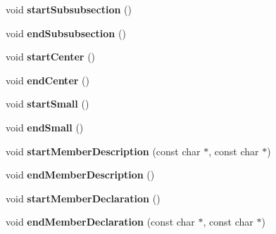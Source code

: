 \begin{DoxyCompactItemize}
\item 
\hypertarget{class_r_t_f_generator_a990a0621ea42a9028bb4162b40be4f61}{void {\bfseries start\-Subsubsection} ()}\label{class_r_t_f_generator_a990a0621ea42a9028bb4162b40be4f61}

\item 
\hypertarget{class_r_t_f_generator_af3a0a92b5bad729bb6eeafb07ca54b8f}{void {\bfseries end\-Subsubsection} ()}\label{class_r_t_f_generator_af3a0a92b5bad729bb6eeafb07ca54b8f}

\item 
\hypertarget{class_r_t_f_generator_abdafeba989f102a3656f6b3341ddc79b}{void {\bfseries start\-Center} ()}\label{class_r_t_f_generator_abdafeba989f102a3656f6b3341ddc79b}

\item 
\hypertarget{class_r_t_f_generator_a3e879450d54b627a5d86065b831ca0ac}{void {\bfseries end\-Center} ()}\label{class_r_t_f_generator_a3e879450d54b627a5d86065b831ca0ac}

\item 
\hypertarget{class_r_t_f_generator_a3a61d98acef498d905bd2c3f070a02a1}{void {\bfseries start\-Small} ()}\label{class_r_t_f_generator_a3a61d98acef498d905bd2c3f070a02a1}

\item 
\hypertarget{class_r_t_f_generator_afd1e7cfc27d1c1aa0638c9c4f94ee469}{void {\bfseries end\-Small} ()}\label{class_r_t_f_generator_afd1e7cfc27d1c1aa0638c9c4f94ee469}

\item 
\hypertarget{class_r_t_f_generator_abc55523ac9a74887fb868ad11d0956a0}{void {\bfseries start\-Member\-Description} (const char $\ast$, const char $\ast$)}\label{class_r_t_f_generator_abc55523ac9a74887fb868ad11d0956a0}

\item 
\hypertarget{class_r_t_f_generator_a0dd91ddf8c2ef96803ec72c46964fdfd}{void {\bfseries end\-Member\-Description} ()}\label{class_r_t_f_generator_a0dd91ddf8c2ef96803ec72c46964fdfd}

\item 
\hypertarget{class_r_t_f_generator_adc7e1ef5ab7013afb090683808aec804}{void {\bfseries start\-Member\-Declaration} ()}\label{class_r_t_f_generator_adc7e1ef5ab7013afb090683808aec804}

\item 
\hypertarget{class_r_t_f_generator_a72e9196e0361b6a7c0388f61047141dc}{void {\bfseries end\-Member\-Declaration} (const char $\ast$, const char $\ast$)}\label{class_r_t_f_generator_a72e9196e0361b6a7c0388f61047141dc}


\end{DoxyCompactItemize}

